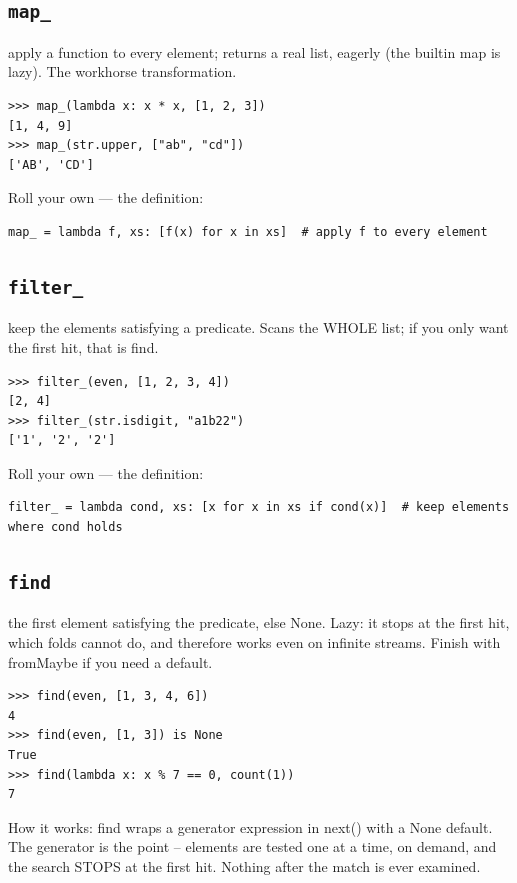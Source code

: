 \documentclass[10pt,letterpaper]{book}
\begin{document}
\subsection{\texttt{map\_}}\label{def:map-}
apply a function to every element; returns a real list, eagerly (the builtin map is lazy). The workhorse transformation.
\begin{lstlisting}[style=ex]
>>> map_(lambda x: x * x, [1, 2, 3])
[1, 4, 9]
>>> map_(str.upper, ["ab", "cd"])
['AB', 'CD']
\end{lstlisting}

Roll your own --- the definition:

\begin{lstlisting}[style=ex]
map_ = lambda f, xs: [f(x) for x in xs]  # apply f to every element
\end{lstlisting}
\subsection{\texttt{filter\_}}\label{def:filter-}
keep the elements satisfying a predicate. Scans the WHOLE list; if you only want the first hit, that is find.
\begin{lstlisting}[style=ex]
>>> filter_(even, [1, 2, 3, 4])
[2, 4]
>>> filter_(str.isdigit, "a1b22")
['1', '2', '2']
\end{lstlisting}

Roll your own --- the definition:

\begin{lstlisting}[style=ex]
filter_ = lambda cond, xs: [x for x in xs if cond(x)]  # keep elements where cond holds
\end{lstlisting}
\subsection{\texttt{find}}\label{def:find}
the first element satisfying the predicate, else None. Lazy: it stops at the first hit, which folds cannot do, and therefore works even on infinite streams. Finish with fromMaybe if you need a default.
\begin{lstlisting}[style=ex]
>>> find(even, [1, 3, 4, 6])
4
>>> find(even, [1, 3]) is None
True
>>> find(lambda x: x % 7 == 0, count(1))
7
\end{lstlisting}

How it works: find wraps a generator expression in next() with a None default. The generator is the point -- elements are tested one at a time, on demand, and the search STOPS at the first hit. Nothing after the match is ever examined.
\end{document}
